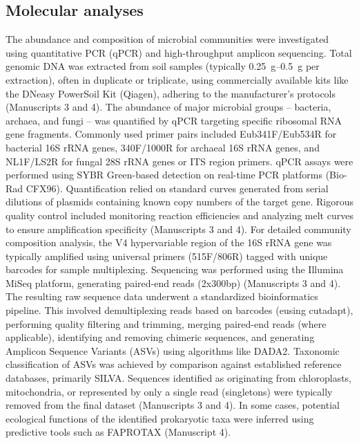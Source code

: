 \subsection{Molecular analyses}

The abundance and composition of microbial communities were investigated using quantitative PCR (qPCR) and high-throughput amplicon sequencing. Total genomic DNA was extracted from soil samples (typically \SIrange[range-phrase=--,range-units=single]{0.25}{0.5}{\gram} per extraction), often in duplicate or triplicate, using commercially available kits like the DNeasy PowerSoil Kit (Qiagen), adhering to the manufacturer's protocols (Manuscripts 3 and 4). The abundance of major microbial groups – bacteria, archaea, and fungi – was quantified by qPCR targeting specific ribosomal RNA gene fragments. Commonly used primer pairs included Eub341F/Eub534R for bacterial 16S rRNA genes, 340F/1000R for archaeal 16S rRNA genes, and NL1F/LS2R for fungal 28S rRNA genes or ITS region primers. qPCR assays were performed using SYBR Green-based detection on real-time PCR platforms (Bio-Rad CFX96). Quantification relied on standard curves generated from serial dilutions of plasmids containing known copy numbers of the target gene. Rigorous quality control included monitoring reaction efficiencies and analyzing melt curves to ensure amplification specificity (Manuscripts 3 and 4). For detailed community composition analysis, the V4 hypervariable region of the 16S rRNA gene was typically amplified using universal primers (515F/806R) tagged with unique barcodes for sample multiplexing. Sequencing was performed using the Illumina MiSeq platform, generating paired-end reads (2x300bp) (Manuscripts 3 and 4). The resulting raw sequence data underwent a standardized bioinformatics pipeline. This involved demultiplexing reads based on barcodes (eusing cutadapt), performing quality filtering and trimming, merging paired-end reads (where applicable), identifying and removing chimeric sequences, and generating Amplicon Sequence Variants (ASVs) using algorithms like DADA2. Taxonomic classification of ASVs was achieved by comparison against established reference databases, primarily SILVA. Sequences identified as originating from chloroplasts, mitochondria, or represented by only a single read (singletons) were typically removed from the final dataset (Manuscripts 3 and 4). In some cases, potential ecological functions of the identified prokaryotic taxa were inferred using predictive tools such as FAPROTAX (Manuscript 4).

